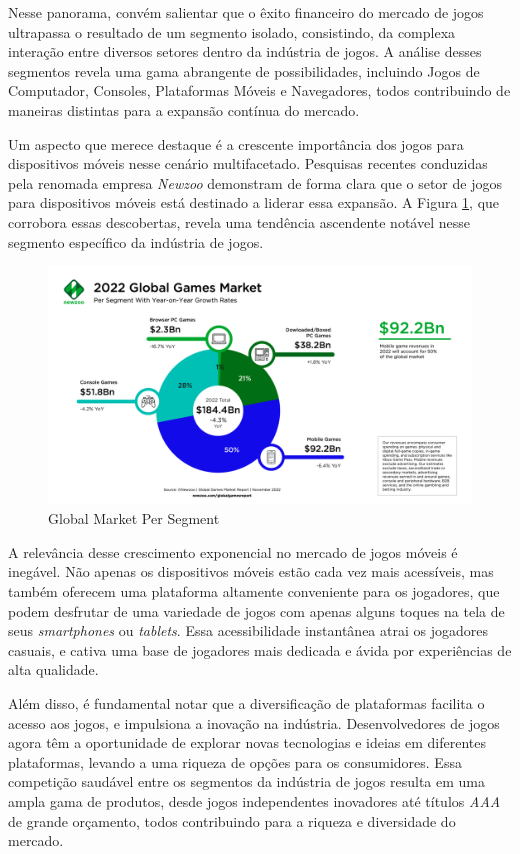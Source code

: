 Nesse panorama, convém salientar que o êxito financeiro do mercado de jogos ultrapassa o resultado de um segmento isolado, consistindo, da complexa interação entre diversos setores dentro da indústria de jogos. A análise desses segmentos revela uma gama abrangente de possibilidades, incluindo Jogos de Computador, Consoles, Plataformas Móveis e Navegadores, todos contribuindo de maneiras distintas para a expansão contínua do mercado.

Um aspecto que merece destaque é a crescente importância dos jogos para dispositivos móveis nesse cenário multifacetado. Pesquisas recentes conduzidas pela renomada empresa \textit{\gls{Newzoo}} demonstram de forma clara que o setor de jogos para dispositivos móveis está destinado a liderar essa expansão. A Figura \ref{GlobalMarketPerSegment}, que corrobora essas descobertas, revela uma tendência ascendente notável nesse segmento específico da indústria de jogos.

\begin{figure}[H]
	\centering
	\includegraphics[scale=0.22]{imagens/revisaoLeitura/global_games_market_per_segment.png}
	\caption{Global Market Per Segment}
	\label{GlobalMarketPerSegment}
\end{figure}

A relevância desse crescimento exponencial no mercado de jogos móveis é inegável. Não apenas os dispositivos móveis estão cada vez mais acessíveis, mas também oferecem uma plataforma altamente conveniente para os jogadores, que podem desfrutar de uma variedade de jogos com apenas alguns toques na tela de seus \textit{smartphones} ou \textit{tablets}. Essa acessibilidade instantânea atrai os jogadores casuais, e cativa uma base de jogadores mais dedicada e ávida por experiências de alta qualidade.

Além disso, é fundamental notar que a diversificação de plataformas facilita o acesso aos jogos, e impulsiona a inovação na indústria. Desenvolvedores de jogos agora têm a oportunidade de explorar novas tecnologias e ideias em diferentes plataformas, levando a uma riqueza de opções para os consumidores. Essa competição saudável entre os segmentos da indústria de jogos resulta em uma ampla gama de produtos, desde jogos independentes inovadores até títulos \textit{\gls{AAA}} de grande orçamento, todos contribuindo para a riqueza e diversidade do mercado.